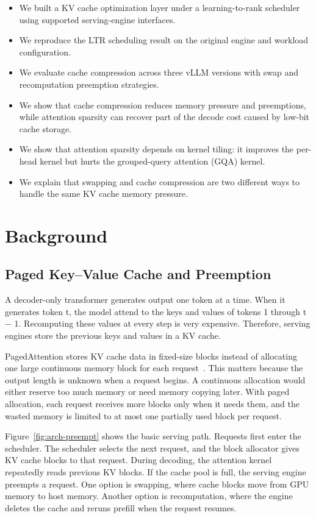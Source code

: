 \documentclass[conference]{IEEEtran}
\begin{document}
\begin{itemize}
  \item We built a KV cache optimization layer under a learning-to-rank scheduler using supported serving-engine interfaces.
  \item We reproduce the LTR scheduling result on the original engine and workload configuration.
  \item We evaluate cache compression across three vLLM versions with swap and recomputation preemption strategies.
  \item We show that cache compression reduces memory pressure and preemptions, while attention sparsity can recover part of the decode cost caused by low-bit cache storage.
  \item We show that attention sparsity depends on kernel tiling: it improves the per-head kernel but hurts the grouped-query attention (GQA) kernel.
  \item We explain that swapping and cache compression are two different ways to handle the same KV cache memory pressure.
\end{itemize}

\clearpage
\section{Background}

\subsection{Paged Key--Value Cache and Preemption}

A decoder-only transformer generates output one token at a time. When it generates token t, the model attend to the keys and values of tokens 1 through t $-$ 1. Recomputing these values at every step is very expensive. Therefore, serving engines store the previous keys and values in a KV cache.

PagedAttention stores KV cache data in fixed-size blocks instead of allocating one large continuous memory block for each request~\cite{vllm2023}. This matters because the output length is unknown when a request begins. A continuous allocation would either reserve too much memory or need memory copying later. With paged allocation, each request receives more blocks only when it needs them, and the wasted memory is limited to at most one partially used block per request.

Figure~\ref{fig:arch-preempt} shows the basic serving path. Requests first enter the scheduler. The scheduler selects the next request, and the block allocator gives KV cache blocks to that request. During decoding, the attention kernel repeatedly reads previous KV blocks. If the cache pool is full, the serving engine preempts a request. One option is swapping, where cache blocks move from GPU memory to host memory. Another option is recomputation, where the engine deletes the cache and reruns prefill when the request resumes.
\end{document}
